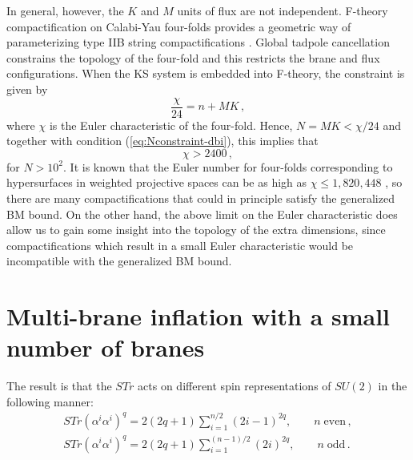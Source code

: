 In general, however, the $K$ and $M$ units of flux are not independent. 
F-theory compactification on Calabi-Yau four-folds
provides a geometric way of parameterizing  
type IIB string compactifications
\cite{witten1,witten2,witten3,sethi,gkp,klemm}. 
Global tadpole cancellation constrains the topology of the four-fold
and this restricts the brane and flux configurations.  
When the KS system is embedded into F-theory, the  
constraint is given by \cite{gkp}
% 
\begin{equation}
\label{eq:Ftheory}
\frac{\chi}{24} = n + MK \,,
\end{equation}
% 
where $\chi$ is the Euler characteristic of the four-fold.  
Hence, $N = MK < \chi /24$ and together with condition 
(\ref{eq:Nconstraint-dbi}), this implies that
% 
\begin{equation}
\label{eq:chilimit}
\chi > 2400 \,,
\end{equation}
% 
for $N > 10^2$.
It is known that the Euler number for four-folds 
corresponding to hypersurfaces in weighted projective spaces
can be as high as $\chi \le 1,820,448$ \cite{klemm},
so there are many compactifications that could 
in principle satisfy the generalized BM bound.
On the other hand, the above limit on the Euler characteristic 
does allow us to gain some insight into the 
topology of the extra dimensions, since compactifications 
which result in a small Euler characteristic would be  
incompatible with the generalized BM bound. 
% 
% 
\section{Multi-brane inflation with a small number of branes}
\label{sec:finiten-multi}


The result is that the $STr$ acts on different spin representations of $SU(2)$ 
in the following manner:
% 
\begin{eqnarray}
STr (\alpha^i \alpha^i)^q = 2(2q+1)\sum_{i=1}^{n/2}(2i-1)^{2q} , 
\qquad n\; \mathrm{ even}\,, 
\\
STr (\alpha^i \alpha^i)^q = 2(2q+1)\sum_{i=1}^{(n-1)/2} (2i)^{2q} , 
\qquad n\; \mathrm{ odd}\,.
\end{eqnarray}
% 



